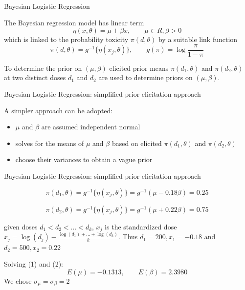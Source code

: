 \documentclass{beamer}
\begin{document}
\begin{frame}{Bayesian Logistic Regression}

The Bayesian regression model has linear term \[
\eta(x,\theta) = \mu +\beta x, \qquad \mu\in R, \beta>0
\] which is linked to the probability toxicity \(\pi(d,\theta)\) by a
suitable link function \[
\pi(d,\theta) = g^{-1}\{\eta (x_j, \theta)\}, \qquad g(\pi) = \log\frac{\pi}{1-\pi}
\]

To determine the prior on \((\mu, \beta)\) elicited prior means
\(\pi(d_1,\theta)\) and \(\pi(d_2,\theta)\) at two distinct doses
\(d_1\) and \(d_2\) are used to determine priors on \((\mu, \beta)\).

\end{frame}

\begin{frame}{Bayesian Logistic Regression: simplified prior elicitation
approach}

A simpler approach can be adopted:

\begin{itemize}
\itemsep1pt\parskip0pt
\item
  \(\mu\) and \(\beta\) are assumed independent normal
\item
  solves for the means of \(\mu\) and \(\beta\) based on elicited
  \(\pi(d_1,\theta)\) and \(\pi(d_2,\theta)\)
\item
  choose their variances to obtain a vague prior
\end{itemize}

\end{frame}

\begin{frame}{Bayesian Logistic Regression: simplified prior elicitation
approach}

\[
\pi(d_1,\theta) = g^{-1}\{\eta (x_j, \theta)\} = g^{-1}(\mu -0.18\beta) = 0.25 
\]

\[
\pi(d_2,\theta) = g^{-1}\{\eta (x_j, \theta)\} = g^{-1}(\mu + 0.22\beta) = 0.75 
\]

given doses \(d_1 < d_2 < \ldots < d_k\), \(x_j\) is the standardized
dose \(x_j = \log(d_j)-\frac{\log(d_1)+\ldots +\log(d_k)}{k}\). Thus
\(d_1=200, x_1 = -0.18\) and \(d_2 = 500, x_2 = 0.22\)

Solving (1) and (2): \[
E(\mu)=-0.1313, \qquad E(\beta)=2.3980
\] We chose \(\sigma_\mu = \sigma_\beta = 2\)

\end{frame}
\end{document}
